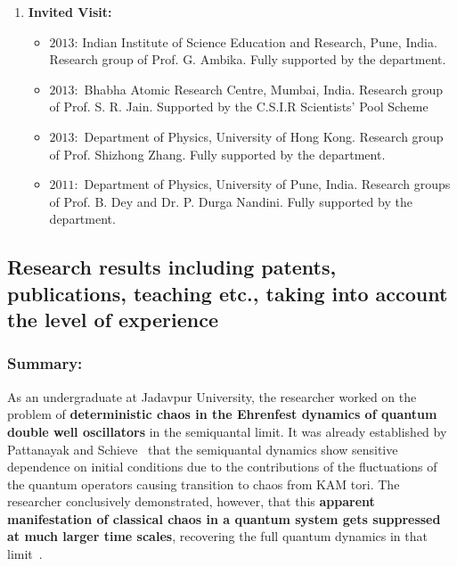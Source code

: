 \documentclass[a4paper,11pt,color]{article}
\begin{document}
\begin{enumerate}
\item
\textbf{Invited Visit:}
\begin{itemize}
\item
$2013$: Indian Institute of Science Education and Research, Pune, India. Research group of Prof. G. Ambika. Fully supported by the department.
\item
$2013:$ Bhabha Atomic Research Centre, Mumbai, India. Research group of Prof. S. R. Jain. Supported by the C.S.I.R Scientists' Pool Scheme
\item 
$2013:$ Department of Physics, University of Hong Kong. Research group of Prof. Shizhong Zhang. Fully supported by the department.
\item
$2011:$ Department of Physics, University of Pune, India. Research groups of Prof. B. Dey and Dr. P. Durga Nandini. Fully supported by the department.
\end{itemize}

\end{enumerate}


\subsection{Research results including patents, publications, teaching etc., taking into account the level of experience}
\label{sec:research_results}
\subsubsection{Summary:}
As an undergraduate at Jadavpur University, the researcher worked on the problem of \textbf{deterministic chaos in the Ehrenfest dynamics of quantum double well oscillators} in the semiquantal limit. It was already established by Pattanayak and Schieve~\cite{patsch} that the {semiquantal dynamics} show sensitive dependence on initial conditions due to the contributions of the fluctuations of the quantum operators causing transition to chaos from KAM tori. The researcher conclusively demonstrated, however, that this \textbf{apparent manifestation of classical chaos in a quantum system gets suppressed at much larger time scales}, recovering the full quantum dynamics in that limit~\cite{myfirstpaper}. 
\end{document}
